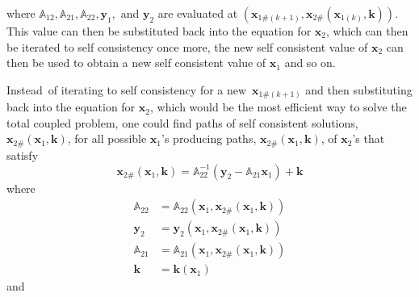 \documentclass[aps,preprint]{revtex4}%
\begin{document}
where $\mathbb{A}_{12},\mathbb{A}_{21},\mathbb{A}_{22},\mathbf{y}_{1},$ and
$\mathbf{y}_{2}$ are evaluated at $\left(  \mathbf{x}_{1\#\left(  k+1\right)
},\mathbf{x}_{2\#}\left(  \mathbf{x}_{1\left(  k\right)  },\mathbf{k}\right)
\right)  $. This value can then be substituted back into the equation for
$\mathbf{x}_{2}$, which can then be iterated to self consistency once more,
the new self consistent value of $\mathbf{x}_{2}$ can then be used to obtain a
new self consistent value of $\mathbf{x}_{1}$ and so on.

Instead\ of iterating to self consistency for a new\ $\mathbf{x}_{1\#\left(
k+1\right)  }$ and then substituting back into the equation for $\mathbf{x}%
_{2}$, which would be the most efficient way to solve the total coupled
problem, one could find paths of self consistent solutions, $\mathbf{x}%
_{2\#}\left(  \mathbf{x}_{1},\mathbf{k}\right)  $, for all possible
$\mathbf{x}_{1}$'s producing paths, $\mathbf{x}_{2\#}\left(  \mathbf{x}%
_{1},\mathbf{k}\right)  $, of $\mathbf{x}_{2}$'s that satisfy
\begin{equation}
\mathbf{x}_{2\#}\left(  \mathbf{x}_{1},\mathbf{k}\right)  =\mathbb{A}%
_{22}^{-1}\left(  \mathbf{y}_{2}-\mathbb{A}_{21}\mathbf{x}_{1}\right)
+\mathbf{k}%
\end{equation}
where
\begin{align}
\mathbb{A}_{22}  &  =\mathbb{A}_{22}\left(  \mathbf{x}_{1},\mathbf{x}%
_{2\#}\left(  \mathbf{x}_{1},\mathbf{k}\right)  \right) \nonumber\\
\mathbf{y}_{2}  &  =\mathbf{y}_{2}\left(  \mathbf{x}_{1},\mathbf{x}%
_{2\#}\left(  \mathbf{x}_{1},\mathbf{k}\right)  \right) \nonumber\\
\mathbb{A}_{21}  &  =\mathbb{A}_{21}\left(  \mathbf{x}_{1},\mathbf{x}%
_{2\#}\left(  \mathbf{x}_{1},\mathbf{k}\right)  \right) \nonumber\\
\mathbf{k}  &  =\mathbf{k}\left(  \mathbf{x}_{1}\right)
\end{align}
and
\end{document}

